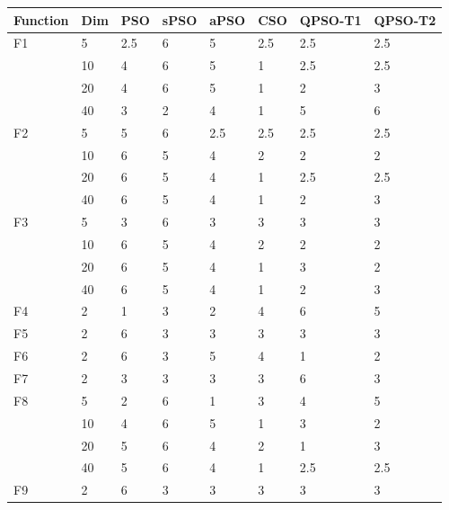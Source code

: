 \begin{longtable}{|l|l|l|l|l|l|l|l|}
\toprule
Function & Dim & PSO & sPSO & aPSO & CSO & QPSO-T1 & QPSO-T2 \\ \midrule
\endhead
\midrule
\endfoot
F1       & 5   & 2.5 & 6    & 5    & 2.5 & 2.5     & 2.5     \\ \cmidrule{2-8}
            & 10  & 4   & 6    & 5    & 1   & 2.5     & 2.5     \\ \cmidrule{2-8}
            & 20  & 4   & 6    & 5    & 1   & 2       & 3       \\ \cmidrule{2-8}
            & 40  & 3   & 2    & 4    & 1   & 5       & 6       \\ \midrule
F2       & 5   & 5   & 6    & 2.5  & 2.5 & 2.5     & 2.5     \\ \cmidrule{2-8}
            & 10  & 6   & 5    & 4    & 2   & 2       & 2       \\ \cmidrule{2-8}
            & 20  & 6   & 5    & 4    & 1   & 2.5     & 2.5     \\ \cmidrule{2-8}
            & 40  & 6   & 5    & 4    & 1   & 2       & 3       \\ \midrule
F3       & 5   & 3   & 6    & 3    & 3   & 3       & 3       \\ \cmidrule{2-8}
            & 10  & 6   & 5    & 4    & 2   & 2       & 2       \\ \cmidrule{2-8}
            & 20  & 6   & 5    & 4    & 1   & 3       & 2       \\ \cmidrule{2-8}
            & 40  & 6   & 5    & 4    & 1   & 2       & 3       \\ \midrule
F4       & 2   & 1   & 3    & 2    & 4   & 6       & 5       \\ \midrule
F5       & 2   & 6   & 3    & 3    & 3   & 3       & 3       \\ \midrule
F6       & 2   & 6   & 3    & 5    & 4   & 1       & 2       \\ \midrule
F7       & 2   & 3   & 3    & 3    & 3   & 6       & 3       \\ \midrule
F8       & 5   & 2   & 6    & 1    & 3   & 4       & 5       \\ \midrule
            & 10  & 4   & 6    & 5    & 1   & 3       & 2       \\ \cmidrule{2-8}
            & 20  & 5   & 6    & 4    & 2   & 1       & 3       \\ \cmidrule{2-8}
            & 40  & 5   & 6    & 4    & 1   & 2.5     & 2.5     \\ \midrule
F9       & 2   & 6   & 3    & 3    & 3   & 3       & 3       \\ \midrule

\end{longtable}
